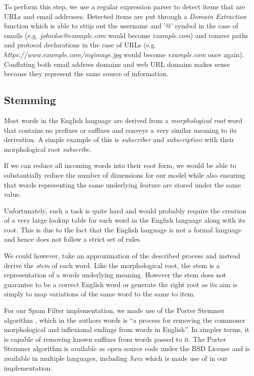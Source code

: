 To perform this step, we use a regular expression parser to detect items that are URLs and email addresses. Detected items are put through a \emph{Domain Extraction} function which is able to strip out the username and '@' symbol in the case of emails (e.g. \emph{johndoe@example.com} would become \emph{example.com}) and remove paths and protocol declarations in the case of URLs (e.g. \emph{https://www.example.com/myimage.jpg} would become \emph{example.com} once again). Conflating both email address domains and web URL domains makes sense because they represent the same source of information.


\subsection{Stemming}
Most words in the English language are derived from a \emph{morphological root} word that contains no prefixes or suffixes and conveys a very similar meaning to its derivation. A simple example of this is \emph{subscriber} and \emph{subscription} with their morphological root \emph{subscribe}. 

If we can reduce all incoming words into their root form, we would be able to substantially reduce the number of dimensions for our model while also ensuring that words representing the same underlying feature are stored under the same value.

Unfortunately, such a task is quite hard and would probably require the creation of a very large lookup table for each word in the English language along with its root. This is due to the fact that the English language is not a formal language and hence does not follow a strict set of rules. 

We could however, take an approximation of the described process and instead derive the \emph{stem} of each word. Like the morphological root, the stem is a representation of a words underlying meaning. However the stem does not guarantee to be a correct English word or generate the right root as its aim is simply to map variations of the same word to the same to item. 

For our Spam Filter implementation, we made use of the Porter Stemmer algorithm \cite{porter1980}, which in the authors words is ``a process for removing the commoner morphological and inflexional endings from words in English''. In simpler terms, it is capable of removing known suffixes from words passed to it. The Porter Stemmer algorithm is available as open source code under the BSD License and is available in multiple languages, including Java which is made use of in our implementation.

